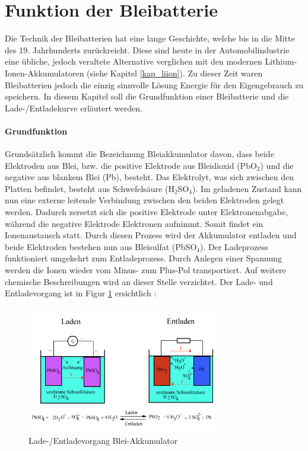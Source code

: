 \section{Funktion der Bleibatterie}

Die Technik der Bleibatterien hat eine lange Geschichte, welche bis in die Mitte des 19. Jahrhunderts zurückreicht. Diese sind heute in der Automobilindustrie eine übliche, jedoch veraltete Alternative verglichen mit den modernen Lithium-Ionen-Akkumulatoren (siehe Kapitel \ref{kap_liion}). Zu dieser Zeit waren Bleibatterien jedoch die einzig sinnvolle Lösung Energie für den Eigengebrauch zu speichern. In diesem Kapitel soll die Grundfunktion einer Bleibatterie und die Lade-/Entladekurve erläutert werden.

\paragraph{Grundfunktion}
Grundsätzlich kommt die Bezeichnung Bleiakkumulator davon, dass beide Elektroden aus Blei, bzw. die positive Elektrode aus Bleidioxid (PbO$_2$) und die negative aus blankem Blei (Pb), besteht. Das Elektrolyt, was sich zwischen den Platten befindet, besteht aus Schwefelsäure (H$_2$SO$_4$). Im geladenen Zustand kann nun eine externe leitende Verbindung zwischen den beiden Elektroden gelegt werden. Dadurch zersetzt sich die positive Elektrode unter Elektronenabgabe, während die negative Elektrode Elektronen aufnimmt. Somit findet ein Ionenaustausch statt. Durch diesen Prozess wird der Akkumulator entladen und beide Elektroden bestehen nun aus Bleisulfat (PbSO$_4$). Der Ladeprozess funktioniert umgekehrt zum Entladeprozess. Durch Anlegen einer Spannung werden die Ionen wieder vom Minus- zum Plus-Pol transportiert. Auf weitere chemische Beschreibungen wird an dieser Stelle verzichtet. Der Lade- und Entladevorgang ist in Figur \ref{fig:pb_akku} ersichtlich \cite{pb_akku_funktion}:

\begin{figure}[h!]
	\centering
		\includegraphics[width=0.75\textwidth]{images/pb_akku.PNG}
	\caption{Lade-/Entladevorgang Blei-Akkumulator \cite{pb_akku_ent_lade}}
	\label{fig:pb_akku}
\end{figure}

